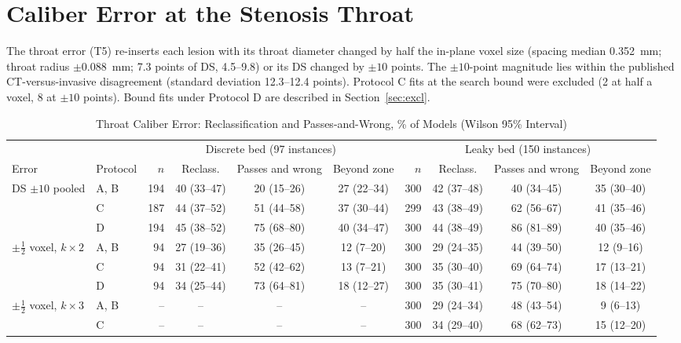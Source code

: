 \documentclass[journal,twoside,web,onecolumn]{ieeecolor}
\begin{document}
\FloatBarrier
{}
\section{Caliber Error at the Stenosis Throat}\label{sec:throat}
The throat error (T5) re-inserts each lesion with its throat diameter changed by half the in-plane voxel size
(spacing median 0.352~mm; throat radius $\pm 0.088$~mm; 7.3 points of DS, 4.5--9.8) or its DS changed by $\pm 10$ points. The $\pm 10$-point magnitude lies within the published CT-versus-invasive disagreement (standard deviation 12.3--12.4 points). Protocol C fits at the search bound were excluded
(2 at half a voxel, 8 at $\pm 10$ points). Bound fits under Protocol D are described in Section~\ref{sec:excl}.
\begin{table}[!ht]
\caption{Throat Caliber Error: Reclassification and Passes-and-Wrong, \% of Models (Wilson 95\% Interval)}\label{tab:throat}
\centering\footnotesize\setlength{\tabcolsep}{3pt}
\begin{tabular}{@{}llrccc rccc@{}}
\toprule
 & & \multicolumn{4}{c}{Discrete bed (97 instances)} & \multicolumn{4}{c}{Leaky bed (150 instances)}\\
\cmidrule(lr){3-6}\cmidrule(l){7-10}
Error & Protocol & $n$ & Reclass. & Passes and wrong & Beyond zone & $n$ & Reclass. & Passes and wrong & Beyond zone\\
\midrule
DS $\pm10$ pooled & A, B & 194 & 40 (33--47) & 20 (15--26) & 27 (22--34) & 300 & 42 (37--48) & 40 (34--45) & 35 (30--40) \\
 & C & 187 & 44 (37--52) & 51 (44--58) & 37 (30--44) & 299 & 43 (38--49) & 62 (56--67) & 41 (35--46) \\
 & D & 194 & 45 (38--52) & 75 (68--80) & 40 (34--47) & 300 & 44 (38--49) & 86 (81--89) & 40 (35--46) \\
$\pm\tfrac12$ voxel, $k\times2$ & A, B & 94 & 27 (19--36) & 35 (26--45) & 12 (7--20) & 300 & 29 (24--35) & 44 (39--50) & 12 (9--16) \\
 & C & 94 & 31 (22--41) & 52 (42--62) & 13 (7--21) & 300 & 35 (30--40) & 69 (64--74) & 17 (13--21) \\
 & D & 94 & 34 (25--44) & 73 (64--81) & 18 (12--27) & 300 & 35 (30--41) & 75 (70--80) & 18 (14--22) \\
\addlinespace[2pt]
$\pm\tfrac12$ voxel, $k\times3$ & A, B & -- & -- & -- & -- & 300 & 29 (24--34) & 48 (43--54) & 9 (6--13) \\
 & C & -- & -- & -- & -- & 300 & 34 (29--40) & 68 (62--73) & 15 (12--20) \\

\end{tabular}
\end{table}
\end{document}
